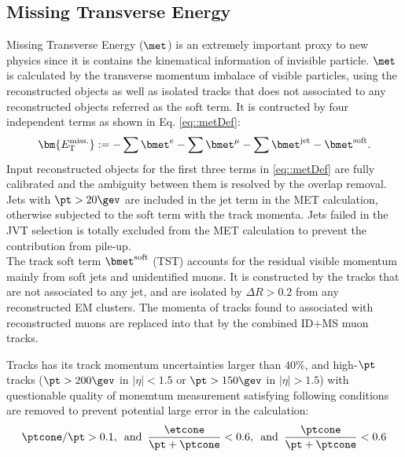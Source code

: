\subsection{Missing Transverse Energy} \label{sec::objDef::met}
Missing Transverse Energy ($\met$) is an extremely important proxy to new physics since it is contains the kinematical information of invisible particle. $\met$ is calculated by the transverse momentum imbalace of visible particles, using the reconstructed objects as well as isolated tracks that does not associated to any reconstructed objects referred as the soft term.
It is contructed by four independent terms as shown in Eq. \ref{eq::metDef}:
\begin{align}
\bm{E_\mathrm{T}^{\mathrm{miss.}}} :=  - \sum \bmet^{e} - \sum \bmet^{\mu} - \sum \bmet^{\mathrm{jet}} - \bmet^{\mathrm{soft}}.
\label{eq::metDef}
\end{align}
Input reconstructed objects for the first three terms in \ref{eq::metDef} are fully calibrated and the ambiguity between them is resolved by the overlap removal. 
Jets with $\pt>20\gev$ are included in the jet term in the MET calculation, otherwise subjected to the soft term with the track momenta.
Jets failed in the JVT selection is totally excluded from the MET calculation to prevent the contribution from pile-up. \\

The track soft term $\bmet^{\mathrm{soft}}$ (TST) \cite{175_MET_Run2_exp} accounts for the residual visible momentum mainly from soft jets and unidentified muons.
It is constructed by the tracks that are not associated to any jet, and are isolated by $\Delta R>0.2$ from any reconstructed EM clusters. The momenta of tracks found to associated with reconstructed muons are replaced into that by the combined ID+MS muon tracks. 

Tracks has its track momentum uncertainties larger than $40\%$, and high-$\pt$ tracks ($\pt>200 \gev$ in $|\eta|<1.5$ or $\pt>150 \gev$ in $|\eta|>1.5$) with questionable quality of monemtum measurement satisfying following conditions are removed to prevent potential large error in the calculation:
\begin{align}
\ptcone/\pt>0.1, \,\,\, \mathrm{and} \,\,\, \frac{\etcone}{\pt+\ptcone}<0.6, \,\,\,  \mathrm{and} \,\,\, \frac{\ptcone}{\pt+\ptcone}<0.6
\end{align}


